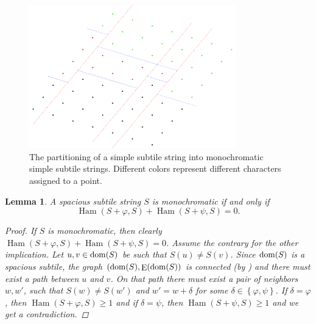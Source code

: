 \documentclass[11pt, letterpaper]{article}
\theoremstyle{plain}
\newtheorem{lemma}{Lemma}
\theoremstyle{definition}
\theoremstyle{remark}
\renewcommand{\phi}{\varphi}
\newcommand{\set}[1]{\left\lbrace #1 \right\rbrace}
\DeclareMathOperator*{\Edges}{E}
\DeclareMathOperator*{\Ham}{Ham}
\begin{document}
\begin{figure}[!t]
	\begin{center}
		\includegraphics[width=0.8\textwidth]{drawings/parquet_decomposition}
	\end{center}
	\caption{The partitioning of a simple subtile string into monochromatic simple subtile strings. Different colors represent different characters assigned to a point.}
	\label{figure:tile_decomposition}
\end{figure}


\begin{lemma}\label{monochromacy_condition}
	A spacious subtile string $S$ is monochromatic if and only if
	\[\Ham(S + \phi, S) + \Ham(S + \psi, S) = 0.\]
	\begin{proof}
		If $S$ is monochromatic, then clearly $\Ham(S + \phi, S) + \Ham(S + \psi, S) = 0$.
		Assume the contrary for the other implication.
		Let $u, v \in \operatorname*{dom}(S)$ be such that $S(u) \neq S(v)$.
		Since $\operatorname*{dom}(S)$ is a spacious subtile, the graph $(\d{S}, \Edges(\d{S})$ is connected (by ) and there must exist a path between $u$ and $v$.
		On that path there must exist a pair of neighbors $w, w'$, such that $S(w) \neq S(w')$ and $w' = w + \delta$ for some $\delta \in \set{\phi, \psi}$.
		If $\delta = \phi$, then $\Ham(S + \phi, S) \ge 1$ and if $\delta = \psi$, then $\Ham(S + \psi, S) \ge 1$ and we get a contradiction.
	\end{proof}
\end{lemma}
\end{document}
